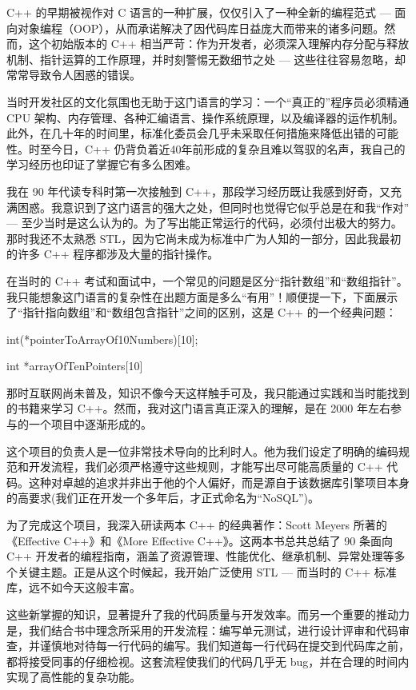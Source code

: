 C++ 的早期被视作对 C 语言的一种扩展，仅仅引入了一种全新的编程范式 --- 面向对象编程（OOP），从而承诺解决了因代码库日益庞大而带来的诸多问题。然而，这个初始版本的 C++ 相当严苛：作为开发者，必须深入理解内存分配与释放机制、指针运算的工作原理，并时刻警惕无数细节之处 --- 这些往往容易忽略，却常常导致令人困惑的错误。

当时开发社区的文化氛围也无助于这门语言的学习：一个“真正的”程序员必须精通 CPU 架构、内存管理、各种汇编语言、操作系统原理，以及编译器的运作机制。此外，在几十年的时间里，标准化委员会几乎未采取任何措施来降低出错的可能性。时至今日，C++ 仍背负着近40年前形成的复杂且难以驾驭的名声，我自己的学习经历也印证了掌握它有多么困难。

我在 90 年代读专科时第一次接触到 C++，那段学习经历既让我感到好奇，又充满困惑。我意识到了这门语言的强大之处，但同时也觉得它似乎总是在和我“作对” --- 至少当时是这么认为的。为了写出能正常运行的代码，必须付出极大的努力。那时我还不太熟悉 STL，因为它尚未成为标准中广为人知的一部分，因此我最初的许多 C++ 程序都涉及大量的指针操作。

在当时的 C++ 考试和面试中，一个常见的问题是区分“指针数组”和“数组指针”。我只能想象这门语言的复杂性在出题方面是多么“有用”！顺便提一下，下面展示了“指针指向数组”和“数组包含指针”之间的区别，这是 C++ 的一个经典问题：

\begin{cpp}
int(*pointerToArrayOf10Numbers)[10];

int *arrayOfTenPointers[10]
\end{cpp}

那时互联网尚未普及，知识不像今天这样触手可及，我只能通过实践和当时能找到的书籍来学习 C++。然而，我对这门语言真正深入的理解，是在 2000 年左右参与的一个项目中逐渐形成的。

这个项目的负责人是一位非常技术导向的比利时人。他为我们设定了明确的编码规范和开发流程，我们必须严格遵守这些规则，才能写出尽可能高质量的 C++ 代码。这种对卓越的追求并非出于他的个人偏好，而是源自于该数据库引擎项目本身的高要求(我们正在开发一个多年后，才正式命名为“NoSQL”)。

为了完成这个项目，我深入研读两本 C++ 的经典著作：Scott Meyers 所著的《Effective C++》和《More Effective C++》。这两本书总共总结了 90 条面向 C++ 开发者的编程指南，涵盖了资源管理、性能优化、继承机制、异常处理等多个关键主题。正是从这个时候起，我开始广泛使用 STL --- 而当时的 C++ 标准库，远不如今天这般丰富。

这些新掌握的知识，显著提升了我的代码质量与开发效率。而另一个重要的推动力是，我们结合书中理念所采用的开发流程：编写单元测试，进行设计评审和代码审查，并谨慎地对待每一行代码的编写。我们知道每一行代码在提交到代码库之前，都将接受同事的仔细检视。这套流程使我们的代码几乎无 bug，并在合理的时间内实现了高性能的复杂功能。

